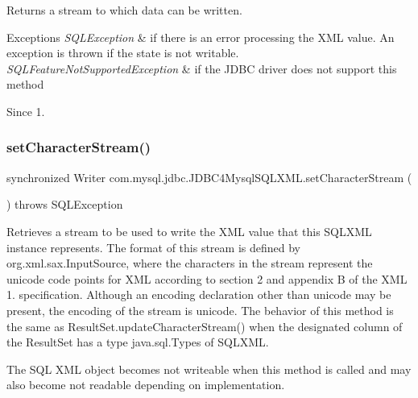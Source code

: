 \begin{DoxyReturn}{Returns}
a stream to which data can be written. 
\end{DoxyReturn}

\begin{DoxyExceptions}{Exceptions}
{\em S\+Q\+L\+Exception} & if there is an error processing the X\+ML value. An exception is thrown if the state is not writable. \\
\hline
{\em S\+Q\+L\+Feature\+Not\+Supported\+Exception} & if the J\+D\+BC driver does not support this method \\
\hline
\end{DoxyExceptions}
\begin{DoxySince}{Since}
1. 
\end{DoxySince}
\mbox{\label{classcom_1_1mysql_1_1jdbc_1_1_j_d_b_c4_mysql_s_q_l_x_m_l_aeec23a2185a984b32e55942c2554a9f7}} 
\subsubsection{\texorpdfstring{set\+Character\+Stream()}{setCharacterStream()}}
{\footnotesize\ttfamily synchronized Writer com.\+mysql.\+jdbc.\+J\+D\+B\+C4\+Mysql\+S\+Q\+L\+X\+M\+L.\+set\+Character\+Stream (\begin{DoxyParamCaption}{ }\end{DoxyParamCaption}) throws S\+Q\+L\+Exception}

Retrieves a stream to be used to write the X\+ML value that this S\+Q\+L\+X\+ML instance represents. The format of this stream is defined by org.\+xml.\+sax.\+Input\+Source, where the characters in the stream represent the unicode code points for X\+ML according to section 2 and appendix B of the X\+ML 1. specification. Although an encoding declaration other than unicode may be present, the encoding of the stream is unicode. The behavior of this method is the same as Result\+Set.\+update\+Character\+Stream() when the designated column of the Result\+Set has a type java.\+sql.\+Types of S\+Q\+L\+X\+ML. 

The S\+QL X\+ML object becomes not writeable when this method is called and may also become not readable depending on implementation.

